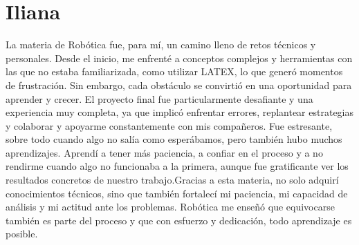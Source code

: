 \section{Iliana}
La materia de Robótica fue, para mí, un camino lleno de retos técnicos y personales. Desde el inicio, me enfrenté a conceptos complejos y herramientas con las que no estaba familiarizada, como utilizar LATEX, lo que generó momentos de frustración. Sin embargo, cada obstáculo se convirtió en una oportunidad para aprender y crecer. El proyecto final fue particularmente desafiante y una experiencia muy completa, ya que implicó enfrentar errores, replantear estrategias y colaborar y apoyarme constantemente con mis compañeros. Fue estresante, sobre todo cuando algo no salía como esperábamos, pero también hubo muchos aprendizajes. Aprendí a tener más paciencia, a confiar en el proceso y a no rendirme cuando algo no funcionaba a la primera, aunque fue  gratificante ver los resultados concretos de nuestro trabajo.Gracias a esta materia, no solo adquirí conocimientos técnicos, sino que también fortalecí mi paciencia, mi capacidad de análisis y mi actitud ante los problemas. Robótica me enseñó que equivocarse también es parte del proceso y que con esfuerzo y dedicación, todo aprendizaje es posible.

